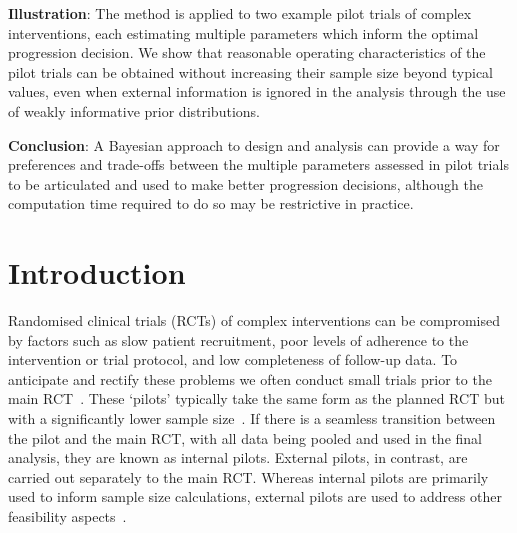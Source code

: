 \documentclass[AMA,STIX1COL]{WileyNJD-v2}
\begin{document}
{\noindent\textbf{Illustration}: The method is applied to two example pilot trials of complex interventions, each estimating multiple parameters which inform the optimal progression decision. We show that reasonable operating characteristics of the pilot trials can be obtained without increasing their sample size beyond typical values, even when external information is ignored in the analysis through the use of weakly informative prior distributions. 

\noindent\textbf{Conclusion}: A Bayesian approach to design and analysis can provide a way for preferences and trade-offs between the multiple parameters assessed in pilot trials to be articulated and used to make better progression decisions, although the computation time required to do so may be restrictive in practice.
}


\maketitle

\section{Introduction}\label{sec:introduction}


Randomised clinical trials (RCTs) of complex interventions can be compromised by factors such as slow patient recruitment, poor levels of adherence to the intervention or trial protocol, and low completeness of follow-up data. To anticipate and rectify these problems we often conduct small trials prior to the main RCT~\cite{Craig2008}. These `pilots' typically take the same form as the planned RCT but with a significantly lower sample size~\cite{Eldridge2016}. If there is a seamless transition between the pilot and the main RCT, with all data being pooled and used in the final analysis, they are known as internal pilots. External pilots, in contrast, are carried out separately to the main RCT. Whereas internal pilots are primarily used to inform sample size calculations, external pilots are used to address other feasibility aspects~\cite{Thabane2010}.

\end{document}
